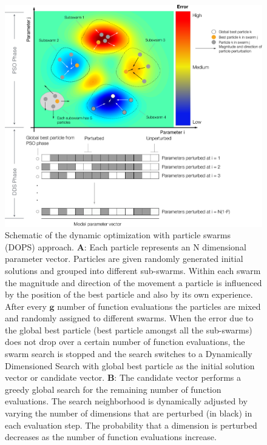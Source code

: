 \documentclass[12pt]{article}
\begin{document}
\begin{figure}[h]
\centering
\includegraphics[width=1.0\textwidth]{./figs/Figure_1_Algorithm.pdf}
\caption{Schematic of the dynamic optimization with particle swarms (DOPS) approach. \textbf{A}: Each particle represents an N dimensional parameter vector. Particles are given randomly generated initial solutions and grouped into different sub-swarms. Within each swarm the magnitude and direction of the movement a particle is influenced by the position of the best particle and also by its own experience. After every $\mathbf{g}$ number of function evaluations the particles are mixed and randomly assigned to different swarms. When the error due to the global best particle (best particle amongst all the sub-swarms) does not drop over a certain number of function evaluations, the swarm search is stopped and the search switches to a Dynamically Dimensioned Search with global best particle as the initial solution vector or candidate vector.
\textbf{B}: The candidate vector performs a greedy global search for the remaining number of function evaluations. The search neighborhood is dynamically adjusted by varying the number of dimensions that are perturbed (in black) in each evaluation step. The probability that a dimension is perturbed decreases as the number of function evaluations increase.
}\label{fig-algorithm}
\end{figure}

\clearpage
\end{document}

